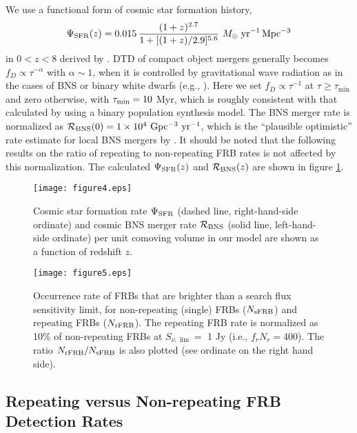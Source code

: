 \documentclass[]{pasj01}
\begin{document}
We use a functional form of cosmic star formation history,
\begin{eqnarray}
\Psi_{\rm SFR}(z)=0.015 \, 
\frac{ (1+z)^{2.7} }{ 1 + [(1+z)/2.9]^{5.6} } \ M_{\odot}\;{\rm
  yr^{-1}\,Mpc^{-3}}
\end{eqnarray}
in $0<z<8$ derived by \citet{Madau&Dickinson2014}.  DTD of compact
object mergers generally becomes $f_D \propto \tau^{-\alpha}$ with
$\alpha \sim 1$, when it is controlled by gravitational wave radiation
as in the cases of BNS or binary white dwarfs (e.g.,
\cite{Totani2008}).  Here we set $f_D \propto \tau^{-1}$ at $\tau \ge
\tau_{\min}$ and zero otherwise, with $\tau_{\rm min}=10$ Myr, which
is roughly consistent with that calculated by \citet{Belczynski2006}
using a binary population synthesis model.  The BNS merger rate is
normalized as ${\cal R}_{\rm BNS}(0) = 1 \times 10^4 {\rm \ Gpc^{-3}
  \ yr^{-1}}$, which is the ``plausible optimistic'' rate estimate for
local BNS mergers by \citet{Abadie2010}.  It should be noted that the
following results on the ratio of repeating to non-repeating FRB rates
is not affected by this normalization. The calculated 
$\Psi_{\rm SFR}(z)$ and ${\cal R}_{\rm BNS}(z)$ are shown 
in figure \ref{fig: nsns rate}.

\begin{figure}
 \texttt{[image: figure4.eps]}
 \caption{Cosmic star formation rate $\Psi_{\rm SFR}$ (dashed line,
   right-hand-side ordinate) and cosmic BNS merger rate ${\cal R}_{\rm
     BNS}$ (solid line, left-hand-side ordinate) per unit comoving
   volume in our model are shown as a function of redshift $z$.}
 \label{fig: nsns rate}
\end{figure}

\begin{figure}
 \texttt{[image: figure5.eps]}
 \caption{ Occurrence rate of FRBs that are brighter than a search
   flux sensitivity limit, for non-repeating (single) FRBs ($N_{\rm
     sFRB}$) and repeating FRBs ($N_{\rm rFRB}$).  The repeating FRB
   rate is normalized as 10\% of non-repeating FRBs at $S_{\nu, \lim}
   = $ 1 Jy (i.e., $f_r N_r = 400$).  The ratio $N_{\rm rFRB} / N_{\rm
     sFRB}$ is also plotted (see ordinate on the right hand side).}
 \label{fig: logN-logS}
\end{figure}

 
\subsection{Repeating versus Non-repeating FRB
Detection Rates}
\end{document}
